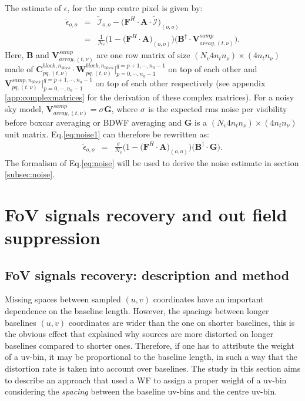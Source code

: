 \documentclass[useAMS,usenatbib]{mn2e}
\begin{document}
The estimate of  $\epsilon$, for the map centre pixel is given by:
\begin{eqnarray}
 \widetilde{\epsilon}_{o,o}&=&\widetilde{\mathcal{I}}_{o,o} - 
\Big(\mathbf{F}^{H}\cdot\mathbf{A}\cdot\widetilde{\mathcal{I}}\Big)_{(o,o)}\\							
&=&\frac{1}{N_{v}}\bigg(1-\Big(\mathbf{F}^{H}\cdot\mathbf{A}\Big)_{(o,o)}\bigg)\bigg(\mathbf{B}^{\dagger}\cdot\mathbf{V}_{array,(t,
\nu)}^{ samp } \bigg)\label{eq:noise1}.
\end{eqnarray}
Here, $\mathbf{B}$ and $\mathbf{V}_{array,(t,\nu)}^{samp}$ are  one row matrix of size $(N_v 4 n_t n_{\nu})\times (4 n_t n_{\nu})$ made of 
$\mathbf{C}_{pq,(t,\nu)}^{block,n_{block}}\cdot \mathbf{W}_{pq,(t,\nu)}^{block,n_{block}}\Big|_{p=0,\cdots,n_{a}-1}^{q=p+1,\cdots,n_{a}-1}$ 
on 
top of each other and $\mathbf{V}_{pq,(t,\nu)}^{samp,n_{block}}\Big|_{p=0,\cdots,n_{a}-1}^{q=p+1,\cdots,n_{a}-1}$ on top of each other 
respectively (see appendix \ref{app:complexmatrices} for the derivation of these complex matrices). For a noisy sky model, 
$\mathbf{V}_{array,(t, \nu)}^{ samp } =\sigma_{}\mathbf{G}$, 
where $\sigma_{}$ is the expected rms noise per visibility before boxcar averaging or BDWF averaging and $\mathbf{G}$ is a $(N_v 4 n_t 
n_{\nu}) \times (4 n_t n_{\nu})$ unit matrix. Eq.\ref{eq:noise1} can therefore be rewritten as:
\begin{eqnarray}
 \widetilde{\epsilon}_{o,o}		
&=&\frac{\sigma_{}}{N_{v}}\bigg(1-\Big(\mathbf{F}^{H}\cdot\mathbf{A}\Big)_{(o,o)}\bigg)\bigg(\mathbf{B}^{\dagger}\cdot\mathbf{G}
\bigg).\label{eq:noise}
\end{eqnarray}
The formalism of Eq.\ref{eq:noise} will be used to derive the noise estimate in section \ref{subsec:noise}.
\section{FoV signals recovery and out field suppression}
\subsection{FoV signals recovery: description and method}
\label{baseline1}
Missing spaces between sampled $(u,v)$ coordinates have an important dependence on the baseline length. However, the spacings between 
longer 
baselines $(u,v)$ coordinates are wider than the one on shorter baselines, this is the obvious effect that explained why sources are more 
distorted on longer baselines compared to shorter ones. Therefore, if one has to attribute the weight of a uv-bin, it may be proportional 
to 
the baseline length, in such a way that the distortion rate is taken into account over baselines. The study in this section aims to 
describe an approach that used a WF to assign a proper weight of a uv-bin considering the \textit{spacing} between the baseline uv-bins and 
the centre uv-bin.
\end{document}
